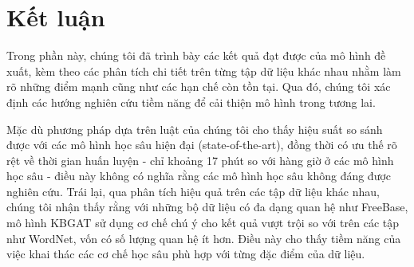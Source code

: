 
\chapter{Kết luận}
\label{chap:Conclusion}

%


Trong phần này, chúng tôi đã trình bày các kết quả đạt được của mô hình đề xuất, kèm theo các phân tích chi tiết trên từng tập dữ liệu khác nhau nhằm làm rõ những điểm mạnh cũng như các hạn chế còn tồn tại. Qua đó, chúng tôi xác định các hướng nghiên cứu tiềm năng để cải thiện mô hình trong tương lai.

Mặc dù phương pháp dựa trên luật của chúng tôi cho thấy hiệu suất so sánh được với các mô hình học sâu hiện đại (state-of-the-art), đồng thời có ưu thế rõ rệt về thời gian huấn luyện - chỉ khoảng 17 phút so với hàng giờ ở các mô hình học sâu - điều này không có nghĩa rằng các mô hình học sâu không đáng được nghiên cứu. Trái lại, qua phân tích hiệu quả trên các tập dữ liệu khác nhau, chúng tôi nhận thấy rằng với những bộ dữ liệu có đa dạng quan hệ như FreeBase, mô hình KBGAT sử dụng cơ chế chú ý cho kết quả vượt trội so với trên các tập như WordNet, vốn có số lượng quan hệ ít hơn. Điều này cho thấy tiềm năng của việc khai thác các cơ chế học sâu phù hợp với từng đặc điểm của dữ liệu.


